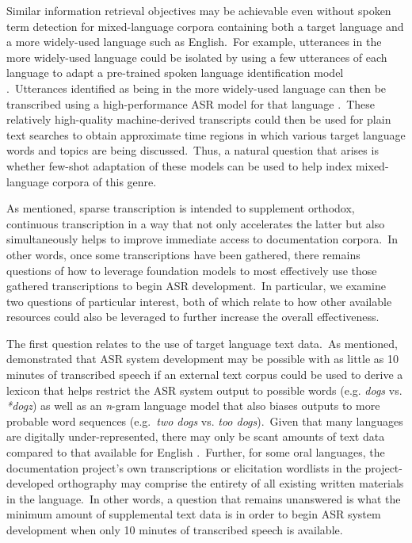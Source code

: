 \documentclass[main.tex]{subfiles}
\begin{document}
Similar information retrieval objectives may be achievable even without spoken term detection for mixed-language corpora containing both a target language and a more widely-used language such as English.~For example, utterances in the more widely-used language could be isolated by using a few utterances of each language to adapt a pre-trained spoken language identification model \parencite[e.g.~SpeechBrain:][]{ravanelli2021speechbrain}.~Utterances identified as being in the more widely-used language can then be transcribed using a high-performance ASR model for that language \parencite[e.g.~wav2vec 2.0 Robust for English:][]{hsu2021robust}.~These relatively high-quality machine-derived transcripts could then be used for plain text searches to obtain approximate time regions in which various target language words and topics are being discussed.~Thus, a natural question that arises is whether few-shot adaptation of these models can be used to help index mixed-language corpora of this genre.

As mentioned, sparse transcription is intended to supplement orthodox, continuous transcription in a way that not only accelerates the latter but also simultaneously helps to improve immediate access to documentation corpora.~In other words, once some transcriptions have been gathered, there remains questions of how to leverage foundation models to most effectively use those gathered transcriptions to begin ASR development.~In particular, we examine two questions of particular interest, both of which relate to how other available resources could also be leveraged to further increase the overall effectiveness. 

The first question relates to the use of target language text data.~As mentioned, \parencite{NEURIPS2020_92d1e1eb} demonstrated that ASR system development may be possible with as little as 10 minutes of transcribed speech if an external text corpus could be used to derive a lexicon that helps restrict the ASR system output to possible words (e.g. \emph{dogs} vs. \emph{*dogz}) as well as an \emph{n}-gram language model that also biases outputs to more probable word sequences (e.g.~\textit{two dogs} vs. \textit{too dogs}).~Given that many languages are digitally under-represented, there may only be scant amounts of text data compared to that available for English \parencite[e.g.~an 803 million word corpus as used in][]{NEURIPS2020_92d1e1eb}.~Further, for some oral languages, the documentation project's own transcriptions or elicitation wordlists in the project-developed orthography may comprise the entirety of all existing written materials in the language.~In other words, a question that remains unanswered is what the minimum amount of supplemental text data is in order to begin ASR system development when only 10 minutes of transcribed speech is available.
\end{document}
